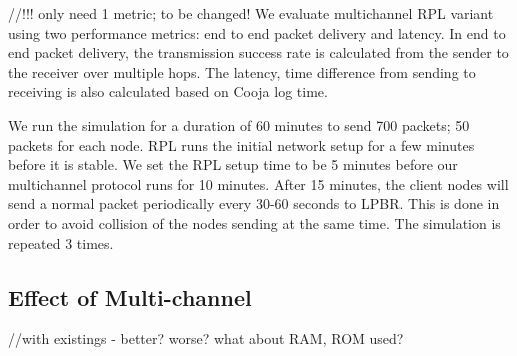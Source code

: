

//!!! only need 1 metric; to be changed!
We evaluate multichannel RPL variant using two performance metrics: end to end packet delivery and latency. In end to end packet delivery, the transmission success rate is calculated from the sender to the receiver over multiple hops. The latency, time difference from sending to receiving is also calculated based on Cooja log time. %

We run the simulation for a duration of 60 minutes to send 700 packets; 50 packets for each node. RPL runs the initial network setup for a few minutes before it is stable. We set the RPL setup time to be 5 minutes before our multichannel protocol runs for 10 minutes. After 15 minutes, the client nodes will send a normal packet periodically every 30-60 seconds to LPBR. This is done in order to avoid collision of the nodes sending at the same time. The simulation is repeated 3 times.




\subsection{Effect of Multi-channel}
//with existings - better? worse? what about RAM, ROM used?

